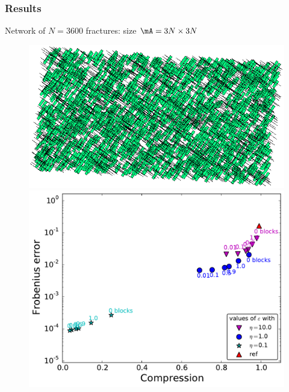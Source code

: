 \begin{frame}
\frametitle{Results}

\small

Network of $N=3600$ fractures: size $\mA=3N\times 3N$
\vspace{-5pt}
\begin{figure}
\centering
\begin{minipage}[c]{.49\linewidth}
\includegraphics[width=\textwidth]{../images/visu_maillage3600FracsV2DN2.png}
\end{minipage}
\begin{minipage}[c]{.49\linewidth}
\includegraphics[width=\textwidth]{../images/graphe_compasparse_output_compression_18_08_2016matrice3600FracsV2DN2.pdf}
\end{minipage}
\end{figure}

\end{frame}

